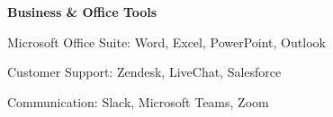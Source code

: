 \textbf{Business \& Office Tools}
\begin{subitems}
    \item Microsoft Office Suite: Word, Excel, PowerPoint, Outlook
    \item Customer Support: Zendesk, LiveChat, Salesforce
    \item Communication: Slack, Microsoft Teams, Zoom
\end{subitems}

